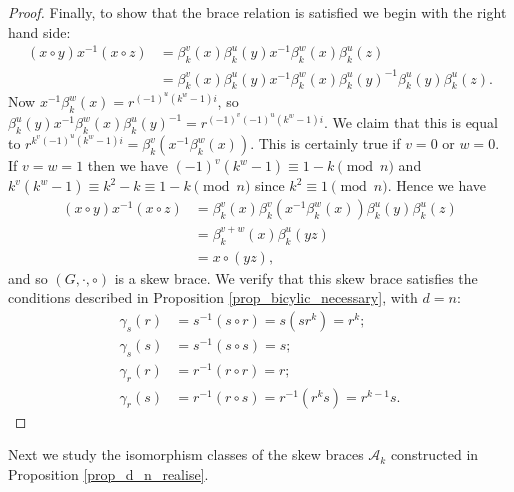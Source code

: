 \documentclass[reqno]{amsart}
\theoremstyle{definition}
\begin{document}
\begin{proof}
Finally, to show that the brace relation is satisfied we begin with the right hand side:
\begin{align*}
(x \circ y)x^{-1}(x \circ z) &= \beta_{k}^{v}(x)\beta_{k}^{u}(y)x^{-1}\beta_{k}^{w}(x)\beta_{k}^{u}(z) \\
&= \beta_{k}^{v}(x)\beta_{k}^{u}(y)x^{-1}\beta_{k}^{w}(x)\beta_{k}^{u}(y)^{-1} \beta_{k}^{u}(y)\beta_{k}^{u}(z).
\end{align*}
Now $ x^{-1}\beta_{k}^{w}(x) = r^{(-1)^{u}(k^{w}-1)i} $, so $ \beta_{k}^{u}(y)x^{-1}\beta_{k}^{w}(x)\beta_{k}^{u}(y)^{-1} = r^{(-1)^{v}(-1)^{u}(k^{w}-1)i} $. We claim that this is equal to $ r^{k^{v}(-1)^{u}(k^{w}-1)i} = \beta_{k}^{v}(x^{-1}\beta_{k}^{w}(x)) $. This is certainly true if $ v=0 $ or $ w=0 $. If $ v=w=1 $ then we have $ (-1)^{v}(k^{w}-1) \equiv 1-k \pmod{n} $ and $ k^{v}(k^{w}-1) \equiv k^{2}-k \equiv 1 - k \pmod{n} $ since $ k^{2} \equiv 1 \pmod{n} $. Hence we have
\begin{align*}
(x \circ y)x^{-1}(x \circ z) &=\beta_{k}^{v}(x)\beta_{k}^{v}(x^{-1}\beta_{k}^{w}(x)) \beta_{k}^{u}(y)\beta_{k}^{u}(z) \\
&= \beta_{k}^{v+w}(x)\beta_{k}^{u}(yz) \\
&= x \circ (yz),
\end{align*}
and so  $ (G,\cdot,\circ) $ is a skew brace. We verify that this skew brace satisfies the conditions described in Proposition \ref{prop_bicylic_necessary}, with $ d=n $:
\begin{align*}
\gamma_{s}(r) &= s^{-1}(s \circ r) = s(sr^{k}) = r^{k}; \\
\gamma_{s}(s) &= s^{-1}(s \circ s) = s; \\
\gamma_{r}(r) &= r^{-1}(r \circ r) = r; \\
\gamma_{r}(s) &= r^{-1}(r \circ s) = r^{-1}(r^{k}s) = r^{k-1}s.
\end{align*}
\end{proof}

Next we study the isomorphism classes of the skew braces $ \mathscr{A}_{k} $ constructed in Proposition \ref{prop_d_n_realise}. 
\end{document}

